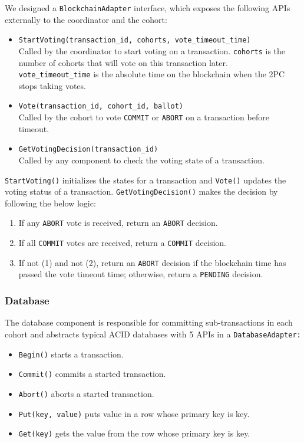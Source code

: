 \documentclass[11pt,sigplan,screen,nonacm]{acmart}
\begin{document}
We designed a \texttt{BlockchainAdapter} interface, which exposes the following APIs externally to the coordinator and the cohort:
\begin{itemize}
  \item \texttt{StartVoting(transaction\_id, cohorts, vote\_timeout\_time)}\\Called by the coordinator to start voting on a transaction. \texttt{cohorts} is the number of cohorts that will vote on this transaction later. \texttt{vote\_timeout\_time} is the absolute time on the blockchain when the 2PC stops taking votes.
  \item \texttt{Vote(transaction\_id, cohort\_id, ballot)}\\Called by the cohort to vote \texttt{COMMIT} or \texttt{ABORT} on a transaction before timeout.
  \item \texttt{GetVotingDecision(transaction\_id)}\\Called by any component to check the voting state of a transaction.
\end{itemize}

\texttt{StartVoting()} initializes the states for a transaction and \texttt{Vote()} updates the voting status of a transaction. \texttt{GetVotingDecision()} makes the decision by following the below logic:
\begin{enumerate}
  \item If any \texttt{ABORT} vote is received, return an \texttt{ABORT} decision.
  \item If all \texttt{COMMIT} votes are received, return a \texttt{COMMIT} decision.
  \item If not (1) and not (2), return an \texttt{ABORT} decision if the blockchain time has passed the vote timeout time; otherwise, return a \texttt{PENDING} decision.
\end{enumerate}

\subsubsection{Database} \label{database}
The database component is responsible for committing sub-transactions in each cohort and abstracts typical ACID databases with 5 APIs in a \texttt{DatabaseAdapter:} 
\begin{itemize}
  \item \texttt{Begin()} starts a transaction.
  \item \texttt{Commit()} commits a started transaction.
  \item \texttt{Abort()} aborts a started transaction.
  \item \texttt{Put(key, value)} puts value in a row whose primary key is key.
  \item \texttt{Get(key)} gets the value from the row whose primary key is key.
\end{itemize}
\end{document}
